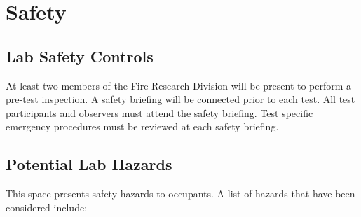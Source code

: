 \documentclass[12pt,oneside]{book}
\begin{document}
\chapter{Safety}
\label{safety}
\section{Lab Safety Controls}
\label{controls}
At least two members of the Fire Research Division will be present to perform a pre-test inspection. A safety briefing will be connected prior to each test. All test participants and observers must attend the safety briefing. Test specific emergency procedures must be reviewed at each safety briefing.

\section{Potential Lab Hazards}
\label{lab_hazards}
This space presents safety hazards to occupants. A list of hazards that have been considered include:
\end{document}
